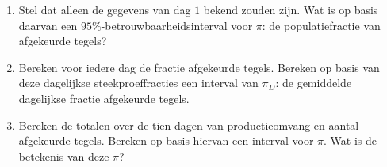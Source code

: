 \begin{enumerate}[label=(\alph*)]
    \item Stel dat alleen de gegevens van dag $1$ bekend zouden zijn.
    Wat is op basis daarvan een $95\%$-betrouwbaarheidsinterval voor $\pi$: de populatiefractie van afgekeurde tegels?
    \answer{

    }

    \item Bereken voor iedere dag de fractie afgekeurde tegels.
    Bereken op basis van deze dagelijkse steekproeffracties een interval van $\pi_{D}$: de gemiddelde dagelijkse fractie afgekeurde tegels.
    \answer{

    }

    \item Bereken de totalen over de tien dagen van productieomvang en aantal afgekeurde tegels.
    Bereken op basis hiervan een interval voor $\pi$.
    Wat is de betekenis van deze $\pi$?
    \answer{
        
    }
\end{enumerate}

